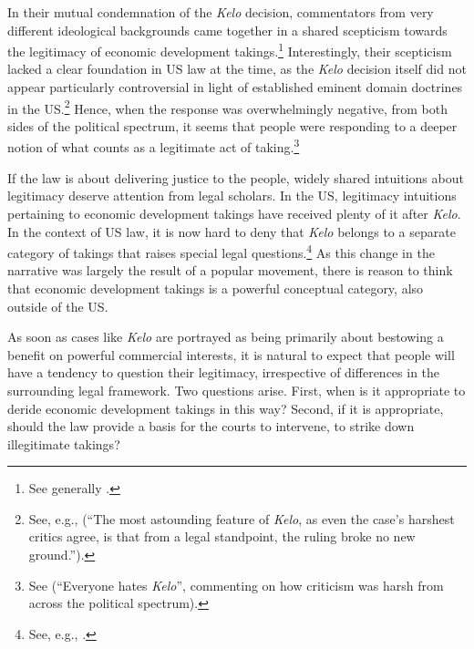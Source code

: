 In their mutual condemnation of the {\it Kelo} decision, commentators from very different ideological backgrounds came together in a shared scepticism towards the legitimacy of economic development takings.\footnote{See generally \cite{somin08}.} Interestingly, their scepticism lacked a clear foundation in US law at the time, as the {\it Kelo} decision itself did not appear particularly controversial in light of established eminent domain doctrines in the US.\footnote{See, e.g., \cite[1418]{bell06} (``The most astounding feature of {\it Kelo}, as even the case's harshest critics agree, is that from a legal standpoint, the ruling broke no new ground.'').} Hence, when the response was overwhelmingly negative, from both sides of the political spectrum, it seems that people were responding to a deeper notion of what counts as a legitimate act of taking.\footnote{See \cite[1413-1415]{bell06} (``Everyone hates {\it Kelo}'', commenting on how criticism was harsh from across the political spectrum).}


If the law is about delivering justice to the people, widely shared intuitions about legitimacy deserve attention from legal scholars. In the US, legitimacy intuitions pertaining to economic development takings have received plenty of it after {\it Kelo}. In the context of US law, it is now hard to deny that {\it Kelo} belongs to a separate category of takings that raises special legal questions.\footnote{See, e.g., \cite{cohen06,somin07}.} As this change in the narrative was largely the result of a popular movement, there is reason to think that economic development takings is a powerful conceptual category, also outside of the US.

As soon as cases like {\it Kelo} are portrayed as being primarily about bestowing a benefit on powerful commercial interests, it is natural to expect that people will have a tendency to question their legitimacy, irrespective of differences in the surrounding legal framework. Two questions arise. First, when is it appropriate to deride economic development takings in this way? Second, if it is appropriate, should the law provide a basis for the courts to intervene, to strike down illegitimate takings?

